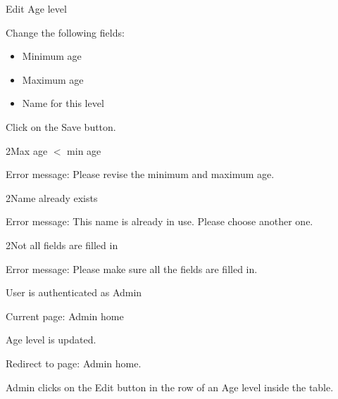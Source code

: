 
\begin{uc}{Edit Age level}

    \begin{uc-mss}
    \item Change the following fields:
        \begin{itemize}
            \item Minimum age
            \item Maximum age
            \item Name for this level
        \end{itemize}
    \item Click on the Save button.
    \end{uc-mss}

    \begin{uc-ext}

                \begin{uc-fail}{2}{Max age $<$ min age}
                \item Error message: Please revise the minimum and maximum age.
                \end{uc-fail}

              \begin{uc-fail}{2}{Name already exists}
                \item Error message: This name is already in use. Please choose another one.
                \end{uc-fail}

       \begin{uc-fail}{2}{Not all fields are filled in}
        \item Error message: Please make sure all the fields are filled in.
       \end{uc-fail}

    \end{uc-ext}

    \begin{uc-pre}
    \item User is authenticated as Admin
    \item Current page: Admin home
    \end{uc-pre}

    \begin{uc-post}
    \item Age level is updated.
    \item Redirect to page: Admin home.
    \end{uc-post}

    \begin{uc-trig}
        Admin clicks on the Edit button in the row of an Age level inside the table.
    \end{uc-trig}

\end{uc}

